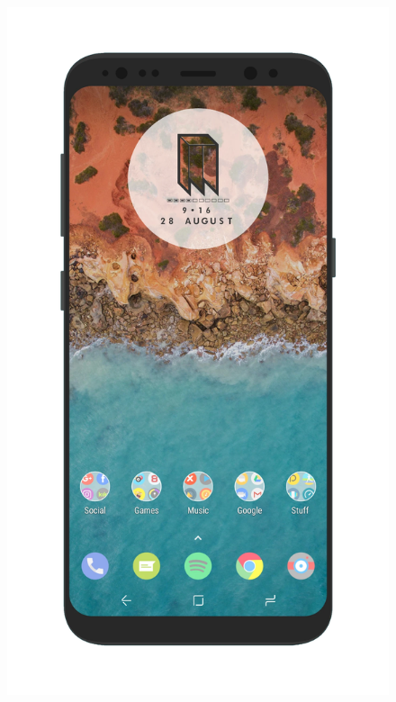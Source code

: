 \begin{frame}
  \begin{figure}
    \includegraphics[height=0.8\textheight]{fig/android.png}

\end{figure}
\end{frame}
